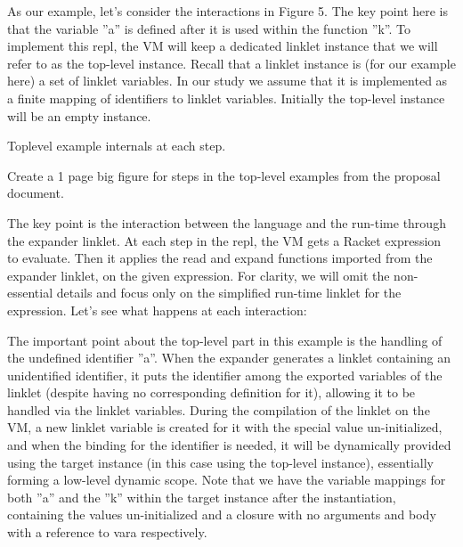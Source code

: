 		\begin{paragraph-here}
			As our example, let’s consider the interactions in Figure 5. The key point here is that the variable ”a” is defined after it is used within the function ”k”. To implement this repl, the VM will keep a dedicated linklet instance that we will refer to as the top-level instance. Recall that a linklet instance is (for our example here) a set of linklet variables. In our study we assume that it is implemented as a finite mapping of identifiers to linklet variables. Initially the top-level instance will be an empty instance.
		\end{paragraph-here}

		\begin{figure-here}
			Toplevel example internals at each step.

			\begin{todo}
				Create a 1 page big figure for steps in the top-level examples from the proposal document.
			\end{todo}
		\end{figure-here}

		\begin{paragraph-here}
			The key point is the interaction between the language and the run-time through the expander linklet. At each step in the repl, the VM gets a Racket expression to evaluate. Then it applies the read and expand functions imported from the expander linklet, on the given expression. For clarity, we will omit the non-essential details and focus only on the simplified run-time linklet for the expression. Let’s see what happens at each interaction:
		\end{paragraph-here}



		\begin{paragraph-here}
			The important point about the top-level part in this example is the handling of the undefined identifier ”a”. When the expander generates a linklet containing an unidentified identifier, it puts the identifier among the exported variables of the linklet (despite having no corresponding definition for it), allowing it to be handled via the linklet variables. During the compilation of the linklet on the VM, a new linklet variable is created for it with the special value un-initialized, and when the binding for the identifier is needed, it will be dynamically provided using the target instance (in this case using the top-level instance), essentially forming a low-level dynamic scope. Note that we have the variable mappings for both ”a” and the ”k” within the target instance after the instantiation, containing the values un-initialized and a closure with no arguments and body with a reference to vara respectively.
		\end{paragraph-here}


